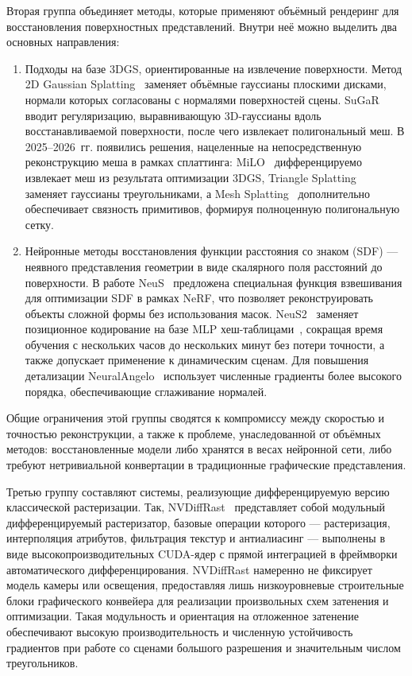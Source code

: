 Вторая группа объединяет методы, которые применяют объёмный рендеринг для
восстановления поверхностных представлений. Внутри неё можно выделить два
основных направления:
\begin{enumerate}
    \item Подходы на базе 3DGS, ориентированные на извлечение поверхности.
          Метод 2D Gaussian Splatting~\cite{2DGS} заменяет объёмные гауссианы
          плоскими дисками, нормали которых согласованы с нормалями поверхностей
          сцены. SuGaR~\cite{SuGaR} вводит регуляризацию, выравнивающую
          3D-гауссианы вдоль восстанавливаемой поверхности, после чего извлекает
          полигональный меш. В 2025--2026~гг. появились решения, нацеленные на
          непосредственную реконструкцию меша в рамках сплаттинга: MiLO~\cite{MiLO}
          дифференцируемо извлекает меш из результата оптимизации 3DGS, Triangle
          Splatting~\cite{TrigSplat} заменяет гауссианы треугольниками, а Mesh
          Splatting~\cite{MeshSplat} дополнительно обеспечивает связность
          примитивов, формируя полноценную полигональную сетку.

    \item Нейронные методы восстановления функции расстояния со знаком (SDF) ---
          неявного представления геометрии в виде скалярного поля расстояний до
          поверхности. В работе NeuS~\cite{NeuS} предложена специальная функция
          взвешивания для оптимизации SDF в рамках NeRF, что позволяет
          реконструировать объекты сложной формы без использования масок.
          NeuS2~\cite{NeuS2} заменяет позиционное кодирование на базе MLP
          хеш-таблицами~\cite{InstantNGP}, сокращая время обучения с нескольких
          часов до нескольких минут без потери точности, а также допускает
          применение к динамическим сценам. Для повышения детализации
          NeuralAngelo~\cite{NeuralAngelo} использует численные градиенты более
          высокого порядка, обеспечивающие сглаживание нормалей.
\end{enumerate}
Общие ограничения этой группы сводятся к компромиссу между скоростью и точностью
реконструкции, а также к проблеме, унаследованной от объёмных методов:
восстановленные модели либо хранятся в весах нейронной сети, либо требуют
нетривиальной конвертации в традиционные графические представления.

Третью группу составляют системы, реализующие дифференцируемую версию
классической растеризации. Так, NVDiffRast~\cite{NVDiffRast} представляет собой
модульный дифференцируемый растеризатор, базовые операции которого ---
растеризация, интерполяция атрибутов, фильтрация текстур и антиалиасинг ---
выполнены в виде высокопроизводительных CUDA-ядер с прямой интеграцией в
фреймворки автоматического дифференцирования. NVDiffRast намеренно не фиксирует
модель камеры или освещения, предоставляя лишь низкоуровневые строительные блоки
графического конвейера для реализации произвольных схем затенения и оптимизации.
Такая модульность и ориентация на отложенное затенение обеспечивают высокую
производительность и численную устойчивость градиентов при работе со сценами
большого разрешения и значительным числом треугольников.

